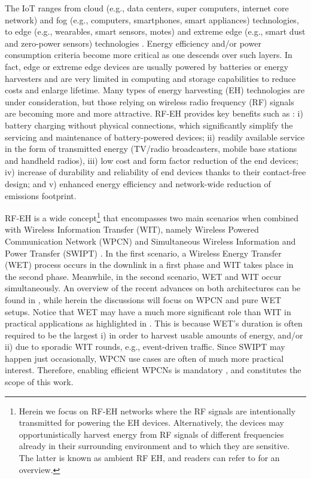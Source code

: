 \documentclass[10pt,journal,a4paper]{IEEEtran}
\begin{document}
	The IoT ranges from cloud (e.g., data centers, super computers, internet core network) and fog (e.g., computers, smartphones, smart appliances) technologies, to edge (e.g., wearables, smart sensors, motes) and extreme edge (e.g., smart dust and zero-power sensors) technologies \cite{Portilla.2019}. Energy efficiency and/or power consumption criteria become more critical as one descends over such layers. In fact, edge or extreme edge devices are usually powered by batteries or energy harvesters and are very limited in computing and storage capabilities to reduce costs and enlarge lifetime. 
	Many types of energy harvesting (EH) technologies are under consideration, but those relying on wireless  radio frequency (RF) signals are becoming more and more attractive.  
	RF-EH provides key benefits such as \cite{Niyato.2017,Lopez.2019}: i) battery charging without physical connections, which significantly simplify the servicing and maintenance of battery-powered devices; ii) readily available service in the form of transmitted energy (TV/radio broadcasters, mobile base stations and handheld radios), iii) low cost and form factor reduction of the end devices; iv) increase of durability and reliability of end devices thanks to their contact-free design; and v) enhanced energy efficiency and network-wide reduction of emissions footprint.
	
	RF-EH is a wide concept\footnote{Herein we focus on RF-EH networks where the RF signals are intentionally transmitted for powering the EH devices. Alternatively, the devices may 		opportunistically harvest energy from RF signals of different frequencies already in their surrounding environment and to which they are sensitive. The latter is known as  ambient RF EH, and readers can refer to \cite{Ghazanfari.2016} for an overview.} that encompasses two main scenarios when combined with Wireless Information Transfer (WIT), namely  Wireless Powered Communication Network (WPCN) and Simultaneous Wireless Information and Power Transfer (SWIPT) \cite{Lopez.2019}. In the first scenario,  a Wireless Energy Transfer (WET) process occurs in the downlink in a first phase and WIT takes place in the second phase. Meanwhile, in the second scenario, WET and WIT occur simultaneously.
	An overview of the recent advances on both architectures can be found in \cite{Clerckx.2019}, while herein the discussions will focus on WPCN and pure WET setups. Notice that WET may have a much more significant role than WIT in practical applications as highlighted in \cite{Lopez.2019}. This is because WET's duration is often required to be the largest i) in order to harvest usable amounts of energy, and/or ii) due to sporadic WIT rounds, e.g., event-driven traffic.
	Since SWIPT may happen just occasionally, WPCN use cases are often of much more practical interest. 
	Therefore, enabling efficient WPCNs is mandatory  \cite{Mahmood.2020,Lopez.2019,Mahmood.2019}, and constitutes the scope of this work.
\end{document}
